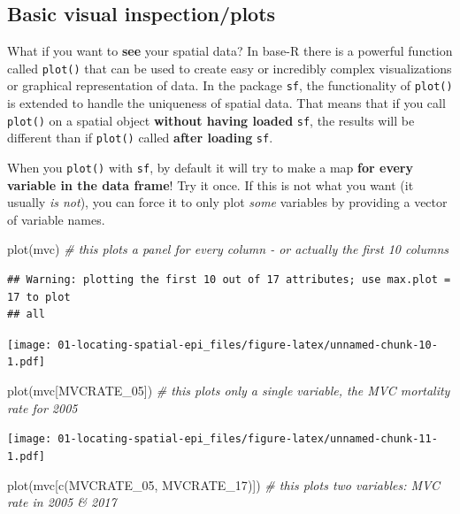\documentclass[
]{book}
\newenvironment{Shaded}{\begin{snugshade}}{\end{snugshade}}
\newcommand{\CommentTok}[1]{\textcolor[rgb]{0.56,0.35,0.01}{\textit{#1}}}
\newcommand{\FunctionTok}[1]{\textcolor[rgb]{0.00,0.00,0.00}{#1}}
\newcommand{\NormalTok}[1]{#1}
\newcommand{\StringTok}[1]{\textcolor[rgb]{0.31,0.60,0.02}{#1}}
\begin{document}
\hypertarget{basic-visual-inspectionplots}{%
\subsection{Basic visual inspection/plots}\label{basic-visual-inspectionplots}}

What if you want to \textbf{see} your spatial data? In base-R there is a powerful function called \texttt{plot()} that can be used to create easy or incredibly complex visualizations or graphical representation of data. In the package \texttt{sf}, the functionality of \texttt{plot()} is extended to handle the uniqueness of spatial data. That means that if you call \texttt{plot()} on a spatial object \textbf{without having loaded} \texttt{sf}, the results will be different than if \texttt{plot()} called \textbf{after loading} \texttt{sf}.

When you \texttt{plot()} with \texttt{sf}, by default it will try to make a map \textbf{for every variable in the data frame}! Try it once. If this is not what you want (it usually \emph{is not}), you can force it to only plot \emph{some} variables by providing a vector of variable names.

\begin{Shaded}
\begin{Highlighting}[]
\FunctionTok{plot}\NormalTok{(mvc) }\CommentTok{\# this plots a panel for every column {-} or actually the first 10 columns}
\end{Highlighting}
\end{Shaded}

\begin{verbatim}
## Warning: plotting the first 10 out of 17 attributes; use max.plot = 17 to plot
## all
\end{verbatim}

\texttt{[image: 01-locating-spatial-epi\_files/figure-latex/unnamed-chunk-10-1.pdf]}

\begin{Shaded}
\begin{Highlighting}[]
\FunctionTok{plot}\NormalTok{(mvc[}\StringTok{\textquotesingle{}MVCRATE\_05\textquotesingle{}}\NormalTok{]) }\CommentTok{\# this plots only a single variable, the MVC mortality rate for 2005}
\end{Highlighting}
\end{Shaded}

\texttt{[image: 01-locating-spatial-epi\_files/figure-latex/unnamed-chunk-11-1.pdf]}

\begin{Shaded}
\begin{Highlighting}[]
\FunctionTok{plot}\NormalTok{(mvc[}\FunctionTok{c}\NormalTok{(}\StringTok{\textquotesingle{}MVCRATE\_05\textquotesingle{}}\NormalTok{, }\StringTok{\textquotesingle{}MVCRATE\_17\textquotesingle{}}\NormalTok{)]) }\CommentTok{\# this plots two variables: MVC rate in 2005 \& 2017}
\end{Highlighting}
\end{Shaded}
\end{document}
